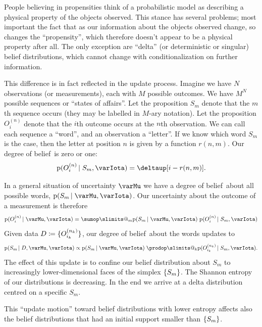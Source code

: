 \documentclass[\ifafour a4paper,12pt,\else a5paper,10pt,\fi%
onecolumn,oneside,article,%
british%
]{memoir}
\makeatletter
\theoremstyle{remark}
\theoremstyle{innote}
\def\sum{\DOTSI\sumop\slimits@}
\def\prod{\DOTSI\prodop\slimits@}
\newcommand*{\delt}{\deltaup}%
\newcommand*{\defd}{\coloneqq}
\DeclarePairedDelimiter\set{\{}{\}}
\newcommand*{\pf}{\mathrm{p}}%
\renewcommand*{\|}{\nonscript\,\vert\nonscript\;\mathopen{}}
\newcommand*{\dob}{degree of belief}
\newcommand*{\yO}[2]{O^{(#1)}_{#2}}
\newcommand*{\yM}{\varMu}
\newcommand*{\yI}{\varIota}
\newcommand*{\yD}{D}
\makeatother
\begin{document}
People believing in propensities think of a probabilistic model as
describing a physical property of the objects observed. This stance has
several problems; most important the fact that as our information about the
objects observed change, so changes the \enquote{propensity}, which
therefore doesn't appear to be a physical property after all. The only
exception are \enquote{delta} (or deterministic or singular) belief
distributions, which cannot change with conditionalization on further
information.

This difference is in fact reflected in the update process. Imagine we have
$N$ observations (or measurements), each with $M$ possible outcomes. We
have $M^N$ possible sequences or \enquote{states of affairs}. Let the
proposition $S_m$ denote that the $m$th sequence occurs (they may be
labelled in $M$-ary notation). Let the proposition $\yO{n}{i}$ denote that
the $i$th outcome occurs at the $n$th observation. We can call each
sequence a \enquote{word}, and an observation a \enquote{letter}. If we
know which word $S_m$ is the case, then the letter at position $n$ is given
by a function $r(n,m)$. Our \dob\ is zero or one:
\begin{equation}
  \label{eq:letter_from_word}
  \pf(\yO{n}{i} \| S_m, \yI) = \delt[i - r(n,m)].
\end{equation}

In a general situation of uncertainty $\yM$ we have a \dob\ about all
possible words, $\pf(S_m \| \yM, \yI)$. Our uncertainty about the outcome
of a measurement is therefore
\begin{equation}
  \label{eq:uncertainty_meas_from_seq}
  \pf(\yO{n}{i} \| \yM, \yI) =
  \sum_m \pf(S_m \| \yM, \yI)\; \pf(\yO{n}{i} \| S_m, \yI)
\end{equation}
Given data $\yD \defd \set{\yO{n_k}{i_k}}$, our \dob\ about the words
updates to
\begin{equation}
  \label{eq:update_dob_words}
  \pf(S_m \| \yD, \yM, \yI) \propto
  \pf(S_m \| \yM, \yI)\;
  \prod_k \pf(\yO{n_k}{i_k} \| S_m, \yI).
\end{equation}
The effect of this update is to confine our belief distribution about $S_m$
to increasingly lower-dimensional faces of the simplex $\set{S_m}$. The
Shannon entropy of our distributions is decreasing. In the end we arrive at
a delta distribution centred on a specific $S_m$.

This \enquote{update motion} toward belief distributions with lower entropy
affects also the belief distributions that had an initial support smaller
than $\set{S_m}$.
\end{document}

